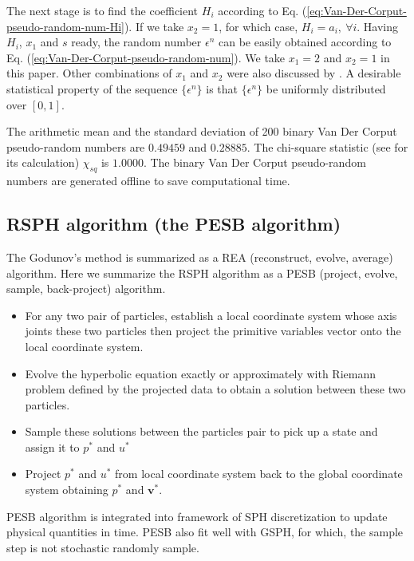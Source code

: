 The next stage is to find the coefficient $H_i$ according to Eq. (\ref{eq:Van-Der-Corput-pseudo-random-num-Hi}). If we take $x_2 = 1$, for which case, $H_i = a_i, \ \forall i$. Having $H_i$, $x_1$ and $s$ ready, the random number $\epsilon ^n $ can be easily obtained according to Eq. (\ref{eq:Van-Der-Corput-pseudo-random-num}).
We take $x_1=2$  and $x_2 =1$ in this paper. Other combinations of $x_1$ and $x_2$ were also discussed by \citet{toro2013riemann}. A desirable statistical property of the sequence $\{\epsilon ^n\}$ is that $\{\epsilon ^n\}$ be uniformly distributed over $[0,1]$.
 
The arithmetic mean and the standard deviation of 200 binary Van Der Corput pseudo-random numbers are $0.49459$ and $0.28885$. The chi-square statistic (see \citet{toro2013riemann} for its calculation) $\chi_{sq}$ is $1.0000$. 
The binary Van Der Corput pseudo-random numbers are generated offline to save computational time.


\subsection{RSPH algorithm (the PESB algorithm)}
The Godunov's method is summarized as a REA (reconstruct, evolve, average) algorithm. Here we summarize the RSPH algorithm as a PESB (project, evolve, sample, back-project) algorithm. 
\begin{itemize}
\item For any two pair of particles, establish a local coordinate system whose axis joints these two particles then project the primitive variables vector onto the local coordinate system.
\item Evolve the hyperbolic equation exactly or approximately with Riemann problem defined by the projected data to obtain a solution between these two particles.
\item Sample these solutions between the particles pair to pick up a state and assign it to $p^{\ast}$ and $u^{\ast}$
\item Project $p^{\ast}$ and $u^{\ast}$ from local coordinate system back to the global coordinate system obtaining $p^{\ast}$ and $\textbf{v}^{\ast}$.
\end{itemize}
PESB algorithm is integrated into framework of SPH discretization to update physical quantities in time. PESB also fit well with GSPH, for which, the sample step is not stochastic randomly sample.

